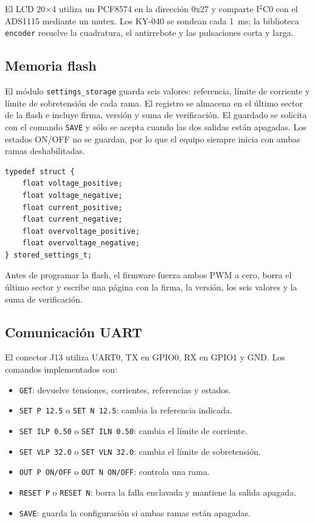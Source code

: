 \documentclass[conference]{IEEEtran}
\begin{document}
El LCD 20$\times$4 utiliza un PCF8574 en la dirección 0x27 y comparte I$^2$C0 con el ADS1115 mediante un mutex. Los KY-040 se sondean cada 1~ms; la biblioteca \texttt{encoder} resuelve la cuadratura, el antirrebote y las pulsaciones corta y larga.

\subsection{Memoria flash}

El módulo \texttt{settings\_storage} guarda seis valores: referencia, límite de corriente y límite de sobretensión de cada rama. El registro se almacena en el último sector de la flash e incluye firma, versión y suma de verificación. El guardado se solicita con el comando \texttt{SAVE} y sólo se acepta cuando las dos salidas están apagadas. Los estados ON/OFF no se guardan, por lo que el equipo siempre inicia con ambas ramas deshabilitadas.

\begin{lstlisting}[caption={Datos persistentes almacenados por cada rama.}]
typedef struct {
    float voltage_positive;
    float voltage_negative;
    float current_positive;
    float current_negative;
    float overvoltage_positive;
    float overvoltage_negative;
} stored_settings_t;
\end{lstlisting}

Antes de programar la flash, el firmware fuerza ambos PWM a cero, borra el último sector y escribe una página con la firma, la versión, los seis valores y la suma de verificación.

\subsection{Comunicación UART}

El conector J13 utiliza UART0, TX en GPIO0, RX en GPIO1 y GND. Los comandos implementados son:

\begin{itemize}
\item \texttt{GET}: devuelve tensiones, corrientes, referencias y estados.
\item \texttt{SET P 12.5} o \texttt{SET N 12.5}: cambia la referencia indicada.
\item \texttt{SET ILP 0.50} o \texttt{SET ILN 0.50}: cambia el límite de corriente.
\item \texttt{SET VLP 32.0} o \texttt{SET VLN 32.0}: cambia el límite de sobretensión.
\item \texttt{OUT P ON/OFF} o \texttt{OUT N ON/OFF}: controla una rama.
\item \texttt{RESET P} o \texttt{RESET N}: borra la falla enclavada y mantiene la salida apagada.
\item \texttt{SAVE}: guarda la configuración si ambas ramas están apagadas.
\end{itemize}
\end{document}
